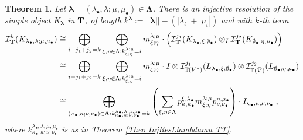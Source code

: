 \documentclass[12pt]{article}
\def\TT {{\mathbb T}}     %
\def\mc {\mathcal}
\newtheorem{theorem}{Theorem}[section]
\begin{document}
\begin{theorem}\label{Theo InjResILlambdamu IT}
Let $\bm\lambda=(\lambda_\bullet,\lambda;\mu,\mu_\bullet)\in \bm\Lambda$. There is an injective resolution of the simple object $K_{\bm\lambda}$ in ${\bf T}$, of length $k^{\bm\lambda}:=||\bm\lambda||-(|\lambda_t|+|\mu_t|)$ and with $k$-th term
\begin{align*}
\mc I_{\bf T}^{k}(K_{\lambda_\bullet,\lambda;\mu,\mu_\bullet}) & \cong \bigoplus\limits_{i+j_1+j_2=k} \bigoplus\limits_{\xi,\eta\in\Lambda: k^{\lambda;\mu}_{\xi;\eta}=i} m^{\lambda;\mu}_{\xi;\eta}\cdot \left( \mc I_{\bf T}^{j_1}(K_{\lambda_\bullet,\xi;\emptyset_\bullet})\otimes_I\mc I_{\bf T}^{j_2}(K_{\emptyset_\bullet;\eta,\mu_\bullet}) \right) \\
& \cong \bigoplus\limits_{i+j_1+j_2=k} \bigoplus\limits_{\xi,\eta\in\Lambda: k^{\lambda;\mu}_{\xi;\eta}=i}  m^{\lambda;\mu}_{\xi;\eta} \cdot I\otimes  \mc I_{\TT(V^*)}^{j_1}(L_{\lambda_\bullet,\xi;\emptyset_\bullet})\otimes\mc I_{\TT(\bar V)}^{j_2}(L_{\emptyset_\bullet;\eta,\mu_\bullet}) \\
&\cong \bigoplus\limits_{(\kappa_\bullet,\kappa;\nu,\nu_\bullet)\in\bm\Lambda:k^{\lambda_\bullet,\lambda;\mu,\mu_\bullet}_{\kappa_\bullet,\kappa;\nu,\nu_\bullet}=k} \left(\sum\limits_{\xi,\eta\in\Lambda} p^{\xi,\lambda_\bullet}_{\kappa,\kappa_\bullet} m^{\lambda;\mu}_{\xi;\eta} p^{\eta,\mu_\bullet}_{\nu,\nu_\bullet} \right) \cdot I_{\kappa_\bullet,\kappa;\nu,\nu_\bullet} \;,
\end{align*}
where $k^{\lambda_\bullet,\lambda;\mu,\mu_\bullet}_{\kappa_\bullet,\kappa;\nu,\nu_\bullet}$ is as in Theorem \ref{Theo InjResLlambdamu TT}.
\end{theorem}
\end{document}
